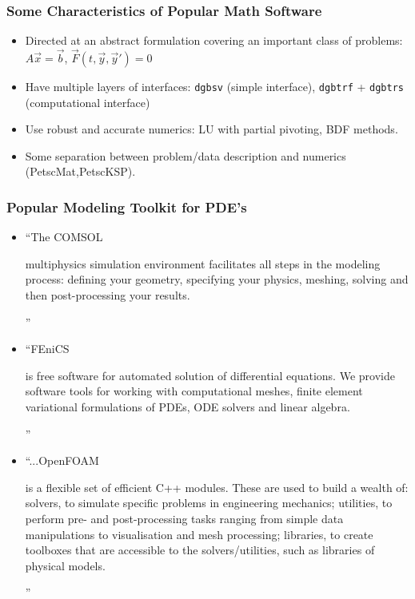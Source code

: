 \documentclass{beamer}
\begin{document}
\begin{frame}
\frametitle{Some Characteristics of Popular Math Software}
\begin{itemize}
\item Directed at an abstract formulation covering an important class
  of problems: $A \vec x = \vec b$, $\vec F(t,\vec y, \vec y') = 0$
\item Have multiple layers of interfaces: \texttt{dgbsv} (simple
  interface), \texttt{dgbtrf} + \texttt{dgbtrs} (computational
  interface)
\item Use robust and accurate numerics: LU with partial pivoting, BDF
  methods.
\item Some separation between problem/data description and numerics
  (PetscMat,PetscKSP).
\end{itemize}
\end{frame}

\begin{frame}
\frametitle{Popular Modeling Toolkit for PDE's}

\begin{itemize}
\item ``The COMSOL \begin{footnotesize}multiphysics simulation
  environment facilitates all steps in the modeling process: defining
  your geometry, specifying your physics, meshing, solving and then
  post-processing your results.\end{footnotesize}''

\item ``FEniCS \begin{footnotesize}is free software for automated
  solution of differential equations. We provide software tools for
  working with computational meshes, finite element variational
  formulations of PDEs, ODE solvers and linear
  algebra.\end{footnotesize}''

\item ``...OpenFOAM \begin{footnotesize}is a flexible set of efficient
  C++ modules. These are used to build a wealth of: solvers, to
  simulate specific problems in engineering mechanics; utilities, to
  perform pre- and post-processing tasks ranging from simple data
  manipulations to visualisation and mesh processing; libraries, to
  create toolboxes that are accessible to the solvers/utilities, such
  as libraries of physical models.\end{footnotesize}''
\end{itemize}
\end{frame}
\end{document}
